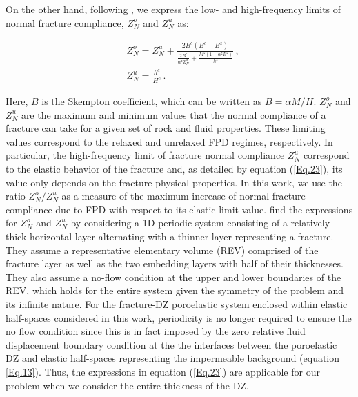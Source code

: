 \documentclass[draft]{agujournal2019}
\begin{document}
On the other hand, following , we express the low- and high-frequency limits of normal fracture compliance, $Z_N^o$ and $Z_N^u$ as:
\begin{linenomath*}
\begin{equation} \label{Eq.23}
\begin{split}
 & Z_N^o= Z_N^u + \frac{2 B^{c} \left(B^c-B^z \right)}{ \frac{2 B^c}{\alpha^z Z_N^d} + \frac{M^z(1-\alpha^z B^{z})}{h^z} }\,,\\
 & Z_N^u= \frac{h^{c}}{H^{c}}\,.
\end{split}
\end{equation}
\end{linenomath*}
Here, $B$ is the Skempton coefficient, which can be written as $B=\alpha M/H$.  $Z_N^o$ and $Z_N^u$ are the maximum and minimum values that the normal compliance of a fracture can take for a given set of rock and fluid properties. These limiting values correspond to the relaxed and unrelaxed FPD regimes, respectively. In particular, the high-frequency limit of fracture normal compliance $Z_N^u$ correspond
to the elastic behavior of the fracture and, as detailed by equation (\ref{Eq.23}), its value only depends on the fracture physical properties. In this work, we use the ratio $Z_N^o/Z_N^u$ as a measure of the maximum increase of normal fracture compliance due to FPD with respect to its elastic limit value.
 find the expressions for $Z_N^o$ and $Z_N^u$ by considering a 1D periodic system consisting of a relatively thick horizontal layer alternating with a thinner layer representing a fracture. They assume a representative elementary volume (REV) comprised of the fracture layer as well as the two embedding layers with half of their thicknesses. 
They also assume a no-flow condition at the  upper and lower boundaries of the REV, which holds for the entire system given the symmetry of the problem and its infinite nature. For  the fracture-DZ poroelastic system enclosed within elastic half-spaces considered in this work, periodicity is no longer required to ensure the no flow condition since this is in fact imposed by the zero relative fluid displacement boundary condition at the the interfaces between the poroelastic DZ and elastic half-spaces representing the impermeable background (equation \ref{Eq.13}). Thus, the expressions in equation (\ref{Eq.23}) are applicable for our problem when we consider the entire thickness of the DZ.
\end{document}
